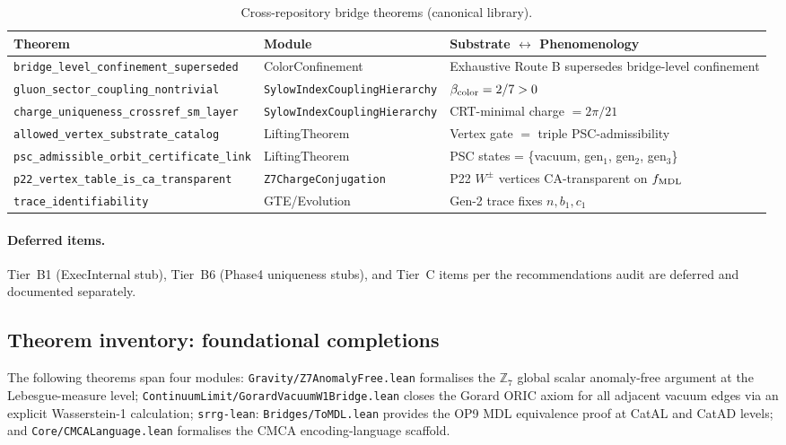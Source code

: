 \documentclass[11pt,a4paper]{article}
\theoremstyle{definition}
\begin{document}
\begin{table}[h]
\centering\small
\begin{tabular}{@{}p{4.8cm}p{3.2cm}p{4.5cm}@{}}
\toprule
Theorem & Module & Substrate $\leftrightarrow$ Phenomenology \\
\midrule
\texttt{bridge\_level\_\allowbreak confinement\_\allowbreak superseded}  & ColorConfinement & Exhaustive Route B supersedes bridge-level confinement \\
\texttt{gluon\_sector\_\allowbreak coupling\_\allowbreak nontrivial}     & \texttt{SylowIndex\allowbreak CouplingHierarchy} & $\beta_{\rm color} = 2/7 > 0$ \\
\texttt{charge\_\allowbreak uniqueness\_\allowbreak crossref\_\allowbreak sm\_layer}  & \texttt{SylowIndex\allowbreak CouplingHierarchy} & CRT-minimal charge $= 2\pi/21$ \\
\texttt{allowed\_\allowbreak vertex\_\allowbreak substrate\_\allowbreak catalog}     & LiftingTheorem & Vertex gate $=$ triple PSC-admissibility \\
\texttt{psc\_admissible\_\allowbreak orbit\_\allowbreak certificate\_\allowbreak link}& LiftingTheorem & PSC states = \{vacuum, gen$_1$, gen$_2$, gen$_3$\} \\
\texttt{p22\_vertex\_\allowbreak table\_is\_\allowbreak ca\_transparent}   & \texttt{Z7Charge\allowbreak Conjugation} & P22 $W^\pm$ vertices CA-transparent on $f_{\rm MDL}$ \\
\texttt{trace\_\allowbreak identifiability}               & GTE/Evolution & Gen-2 trace fixes $n, b_1, c_1$ \\
\bottomrule
\end{tabular}
\caption{Cross-repository bridge theorems (canonical library).}
\label{tab:cross-repo}
\end{table}

\paragraph{Deferred items.}
Tier~B1 (ExecInternal stub), Tier~B6
(Phase4 uniqueness stubs), and Tier~C items per the recommendations audit
are deferred and documented separately.

\subsection{Theorem inventory: foundational completions}\label{subsec:new-theorem-inventory-083}

The following theorems span four modules:
\texttt{Gravity/Z7AnomalyFree.lean} formalises the $\mathbb{Z}_7$ global
scalar anomaly-free argument at the Lebesgue-measure level;
\texttt{ContinuumLimit/GorardVacuumW1Bridge.lean} closes the Gorard ORIC
axiom for all adjacent vacuum edges via an explicit Wasserstein-1 calculation;
\texttt{srrg-lean}: \texttt{Bridges/ToMDL.lean} provides the OP9 MDL equivalence
proof at CatAL and CatAD levels; and \texttt{Core/CMCALanguage.lean} formalises
the CMCA encoding-language scaffold.
\end{document}
